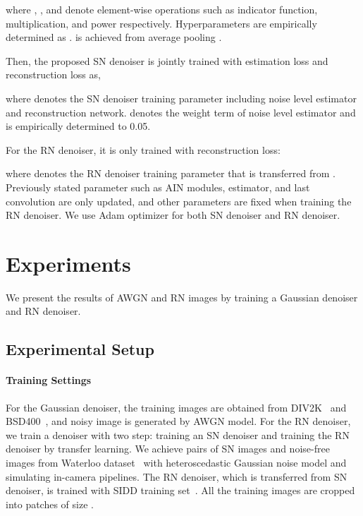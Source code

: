 \documentclass[10pt,twocolumn,letterpaper]{article}
\begin{document}
where , , and  denote element-wise operations such as indicator function, multiplication, and power respectively.
Hyperparameters  are empirically determined as .
 is achieved from  average pooling .

Then, the proposed SN denoiser is jointly trained with estimation loss and  reconstruction loss as,

where  denotes the SN denoiser training parameter including noise level estimator and reconstruction network.
 denotes the weight term of noise level estimator and is empirically determined to 0.05.

For the RN denoiser, it is only trained with reconstruction loss:

where  denotes the RN denoiser training parameter that is transferred from . 
Previously stated parameter such as AIN modules, estimator, and last convolution are only updated, and other parameters are fixed when training the RN denoiser.
We use Adam optimizer for both SN denoiser and RN denoiser.

 
\section{Experiments}
We present the results of AWGN and RN images by training a Gaussian denoiser and RN denoiser.
 
\subsection{Experimental Setup}
\paragraph{Training Settings}
For the Gaussian denoiser, the training images are obtained from DIV2K~\cite{timofte2017ntire} and BSD400~\cite{martin2001database}, and noisy image is generated by AWGN model.
For the RN denoiser, we train a denoiser with two step: training an SN denoiser and training the RN denoiser by transfer learning. 
We achieve pairs of SN images and noise-free images from Waterloo dataset~\cite{ma2016waterloo} with heteroscedastic Gaussian noise model and simulating in-camera pipelines.
The RN denoiser, which is transferred from SN denoiser, is trained with SIDD training set~\cite{abdelhamed2018high}.
All the training images are cropped into patches of size .
\end{document}
